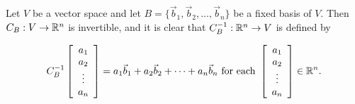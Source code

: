 \documentclass[pdf,9pt]{beamer}
\begin{document}
\begin{frame}[fragile]
\begin{example}
    Let $V$ be a vector space and
    let $B=\{\vec{b}_1, \vec{b}_2, \ldots,\vec{b}_n\}$
    be a fixed basis of $V$.
    Then $C_B:V\to \mathbb{R}^n$ is invertible,
    and it is clear that $C_B^{-1}:\mathbb{R}^n\to V$ is defined by

    \[ C_B^{-1}\left[\begin{array}{c} a_1 \\ a_2 \\ \vdots \\ a_n \end{array}\right] =
    a_1\vec{b}_1 + a_2\vec{b}_2 + \cdots + a_n\vec{b}_n \mbox{ for each }
    \left[\begin{array}{c} a_1 \\ a_2 \\ \vdots \\ a_n \end{array}\right] \in\mathbb{R}^n.  \]
\end{example}
\end{frame}
\end{document}
